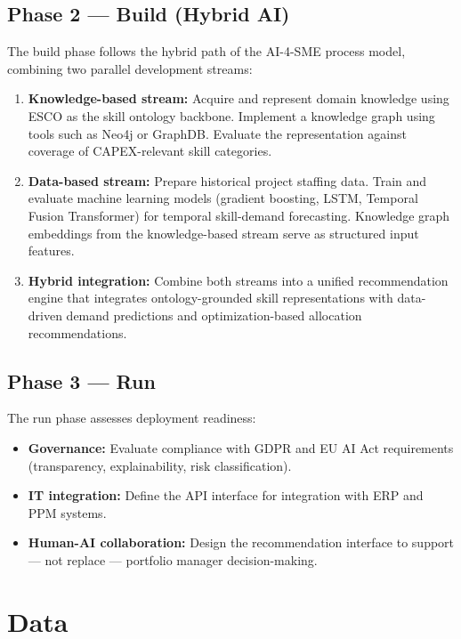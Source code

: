 \subsection*{Phase 2 — Build (Hybrid AI)}

The build phase follows the hybrid path of the AI-4-SME process model, combining two parallel development streams:

\begin{enumerate}
  \item \textbf{Knowledge-based stream:} Acquire and represent domain knowledge using ESCO as the skill ontology backbone. Implement a knowledge graph using tools such as Neo4j or GraphDB. Evaluate the representation against coverage of CAPEX-relevant skill categories.

  \item \textbf{Data-based stream:} Prepare historical project staffing data. Train and evaluate machine learning models (gradient boosting, LSTM, Temporal Fusion Transformer) for temporal skill-demand forecasting. Knowledge graph embeddings from the knowledge-based stream serve as structured input features.

  \item \textbf{Hybrid integration:} Combine both streams into a unified recommendation engine that integrates ontology-grounded skill representations with data-driven demand predictions and optimization-based allocation recommendations.
\end{enumerate}

\subsection*{Phase 3 — Run}

The run phase assesses deployment readiness:

\begin{itemize}
  \item \textbf{Governance:} Evaluate compliance with GDPR and EU AI Act requirements (transparency, explainability, risk classification).
  \item \textbf{IT integration:} Define the API interface for integration with ERP and PPM systems.
  \item \textbf{Human-AI collaboration:} Design the recommendation interface to support — not replace — portfolio manager decision-making.
\end{itemize}

\section{Data}
\label{sec:data}

